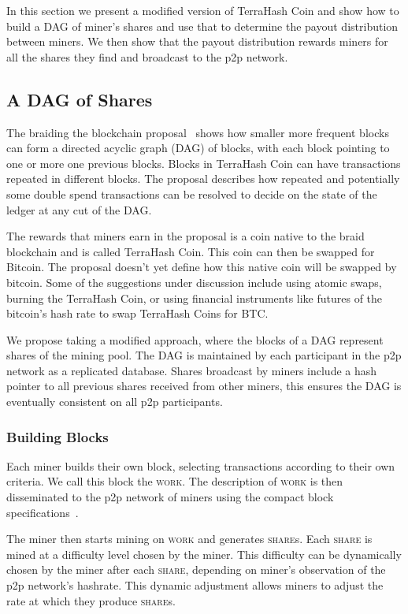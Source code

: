 \documentclass{article}
\begin{document}
In this section we present a modified version of TerraHash Coin and
show how to build a DAG of miner's shares and use that to determine
the payout distribution between miners. We then show that the payout
distribution rewards miners for all the shares they find and
broadcast to the p2p network.

\subsection{A DAG of Shares}

The braiding the blockchain proposal~\cite{mcelrath:variance} shows
how smaller more frequent blocks can form a directed acyclic graph
(DAG) of blocks, with each block pointing to one or more one previous
blocks. Blocks in TerraHash Coin can have transactions repeated in
different blocks. The proposal describes how repeated and potentially
some double spend transactions can be resolved to decide on the state
of the ledger at any cut of the DAG.\@

The rewards that miners earn in the proposal is a coin native to the
braid blockchain and is called TerraHash Coin. This coin can then be
swapped for Bitcoin. The proposal doesn't yet define how this native
coin will be swapped by bitcoin. Some of the suggestions under
discussion include using atomic swaps, burning the TerraHash Coin, or
using financial instruments like futures of the bitcoin's hash rate to
swap TerraHash Coins for BTC.\@

We propose taking a modified approach, where the blocks of a DAG
represent shares of the mining pool. The DAG is maintained by each
participant in the p2p network as a replicated database. Shares
broadcast by miners include a hash pointer to all previous shares
received from other miners, this ensures the DAG is eventually
consistent on all p2p participants.

\subsubsection{Building Blocks}\label{sec:building-blocks}

Each miner builds their own block, selecting transactions according to
their own criteria. We call this block the \textsc{work}. The
description of \textsc{work} is then disseminated to the p2p network
of miners using the compact block
specifications~\cite{compact-blocks}.

The miner then starts mining on \textsc{work} and generates
\textsc{share}s. Each \textsc{share} is mined at a difficulty level
chosen by the miner. This difficulty can be dynamically chosen by the
miner after each \textsc{share}, depending on miner's observation of
the p2p network's hashrate. This dynamic adjustment allows miners to
adjust the rate at which they produce \textsc{share}s.
\end{document}

